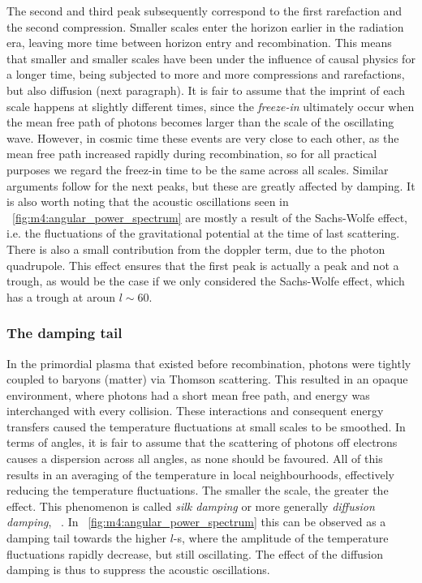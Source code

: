         The second and third peak subsequently correspond to the first rarefaction and the second compression. Smaller scales enter the horizon earlier in the radiation era, leaving more time between horizon entry and recombination. This means that smaller and smaller scales have been under the influence of causal physics for a longer time, being subjected to more and more compressions and rarefactions, but also diffusion (next paragraph). It is fair to assume that the imprint of each scale happens at slightly different times, since the \textit{freeze-in} ultimately occur when the mean free path of photons becomes larger than the scale of the oscillating wave. However, in cosmic time these events are very close to each other, as the mean free path increased rapidly during recombination, so for all practical purposes we regard the freez-in time to be the same across all scales. Similar arguments follow for the next peaks, but these are greatly affected by damping. It is also worth noting that the acoustic oscillations seen in ~\cref{fig:m4:angular_power_spectrum} are mostly a result of the Sachs-Wolfe effect, i.e. the fluctuations of the gravitational potential at the time of last scattering. There is also a small contribution from the doppler term, due to the photon quadrupole. This effect ensures that the first peak is actually a peak and not a trough, as would be the case if we only considered the Sachs-Wolfe effect, which has a trough at aroun $l\sim 60$. 

    \subsubsection{The damping tail}
        In the primordial plasma that existed before recombination, photons were tightly coupled to baryons (matter) via Thomson scattering. This resulted in an opaque environment, where photons had a short mean free path, and energy was interchanged with every collision. These interactions and consequent energy transfers caused the temperature fluctuations at small scales to be smoothed. In terms of angles, it is fair to assume that the scattering of photons off electrons causes a dispersion across all angles, as none should be favoured. All of this results in an averaging of the temperature in local neighbourhoods, effectively reducing the temperature fluctuations. The smaller the scale, the greater the effect. This phenomenon is called \textit{silk damping} or more generally \textit{diffusion damping}, ~\cite{dodelson2020modern}. In ~\cref{fig:m4:angular_power_spectrum} this can be observed as a damping tail towards the higher $l$-s, where the amplitude of the temperature fluctuations rapidly decrease, but still oscillating. The effect of the diffusion damping is thus to suppress the acoustic oscillations. 

